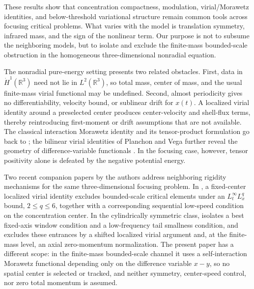 \documentclass{interact}
\numberwithin{equation}{section}
\theoremstyle{plain}
\theoremstyle{definition}
\theoremstyle{remark}
\newcommand{\R}{\mathbb R}
\begin{document}
These results show that concentration compactness, modulation, virial/Morawetz identities, and below-threshold variational structure remain common tools across focusing critical problems. What varies with the model is translation symmetry, infrared mass, and the sign of the nonlinear term. Our purpose is not to subsume the neighboring models, but to isolate and exclude the finite-mass bounded-scale obstruction in the homogeneous three-dimensional nonradial equation.

The nonradial pure-energy setting presents two related obstacles. First, data in $\dot H^1(\R^3)$ need not lie in $L^2(\R^3)$, so total mass, center of mass, and the usual finite-mass virial functional may be undefined. Second, almost periodicity gives no differentiability, velocity bound, or sublinear drift for $x(t)$. A localized virial identity around a preselected center produces center-velocity and shell-flux terms, thereby reintroducing first-moment or drift assumptions that are not available. The classical interaction Morawetz identity and its tensor-product formulation go back to \cite{Morawetz1968,LinStrauss1978,CGT2009}; the bilinear virial identities of Planchon and Vega further reveal the geometry of difference-variable functionals \cite{PlanchonVega2009}. In the focusing case, however, tensor positivity alone is defeated by the negative potential energy.

Two recent companion papers by the authors address neighboring rigidity mechanisms for the same three-dimensional focusing problem. In \cite{ChungHan2026}, a fixed-center localized virial identity excludes bounded-scale critical elements under an $L_t^\infty L_x^q$ bound, $2\le q\le6$, together with a corresponding sequential low-speed condition on the concentration center. In the cylindrically symmetric class, \cite{ChungHanCylindrical2026} isolates a best fixed-axis window condition and a low-frequency tail smallness condition, and excludes these entrances by a shifted localized virial argument and, at the finite-mass level, an axial zero-momentum normalization. The present paper has a different scope: in the finite-mass bounded-scale channel it uses a self-interaction Morawetz functional depending only on the difference variable $x-y$, so no spatial center is selected or tracked, and neither symmetry, center-speed control, nor zero total momentum is assumed.
\end{document}
